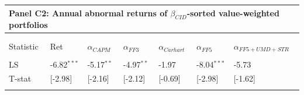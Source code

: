 \documentclass[12pt]{article}
\begin{document}
\begin{table}[!htbp]
\begin{tabularx}{\linewidth}{p{2cm}p{2cm}p{2cm}p{2cm}p{2cm}p{2cm}p{2cm}}
    \toprule
    \multicolumn{7}{l}{\textbf{Panel C2: Annual abnormal returns of $\beta_{CID}$-sorted value-weighted portfolios}} \\
    \midrule
\\[-1.8ex]\hline 
\hline \\[-1.8ex] 
Statistic & Ret & $\alpha_{CAPM}$ & $\alpha_{FF3}$ & $\alpha_{Carhart}$ & $\alpha_{FF5}$ & $\alpha_{FF5+UMD+STR}$ \\ 
\hline \\[-1.8ex] 
LS & -6.82$^{***}$ & -5.17$^{**}$ & -4.97$^{**}$ & -1.97 & -8.04$^{***}$ & -5.73 \\ 
T-stat & [-2.98] & [-2.16] & [-2.12] & [-0.69] & [-2.98] & [-1.62] \\  
\hline \\[-1.8ex] 
\end{tabularx} 

\end{table} 
\end{document}
